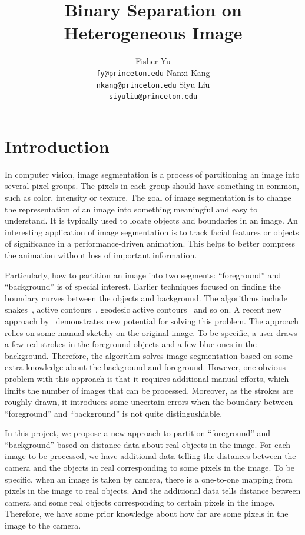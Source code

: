 \documentclass{article} %
\title{Binary Separation on Heterogeneous Image}
\author{
Fisher Yu \\
\texttt{fy@princeton.edu}
\And
Nanxi Kang \\
\texttt{nkang@princeton.edu} 
\And
Siyu Liu\\
\texttt{siyuliu@princeton.edu}
}
\begin{document}
\maketitle

\section{Introduction}

In computer vision, image segmentation is a process of partitioning an 
image into several pixel groups. The pixels in each group should have 
something in common, such as color, intensity or texture. The goal
 of image segmentation is to change the representation of an image into
 something meaningful and easy to understand. It is typically
 used to locate objects and boundaries in an image. An interesting 
application of image segmentation is to track facial features or objects
 of significance in a performance-driven animation. This helps to 
better compress the animation without loss of important information.

Particularly, how to partition an image into two segments: ``foreground''
 and ``background'' is of special interest. Earlier techniques focused 
on finding the boundary curves between the objects and background. 
The algorithms include snakes~\citep{Kass1988snakes}, active 
contours~\citep{Isard1998condensation}, geodesic active
 contours~\citep{Caselles1995geodesic} and so on. A recent new approach 
by~\citet{Boykov2006graph} demonstrates new potential for solving 
this problem. The approach relies on some manual sketchy on the original
 image. To be specific, a user draws a few red strokes in the foreground 
objects and a few blue ones in the background. Therefore, the algorithm
solves image segmentation based on some extra knowledge about the
 background and foreground. However, one obvious problem with this approach 
is that it requires additional manual efforts, which limits the number 
of images that can be processed. Moreover, as the strokes are roughly
drawn, it introduces some uncertain errors when the boundary between 
``foreground'' and ``background'' is not quite distingushiable.

In this project, we propose a new approach to partition ``foreground''
and ``background'' based on distance data about real objects in the image.
For each image to be processed, we have additional data telling the 
distances between the camera and the objects in real corresponding to some
 pixels in the image. To be specific, when an image is taken by camera, 
there is a one-to-one mapping from pixels in the image to real objects. 
And the additional data tells distance between camera and some real objects 
corresponding to certain pixels in the image. Therefore, we have some 
prior knowledge about how far are some pixels in the image to the camera.
\end{document}
